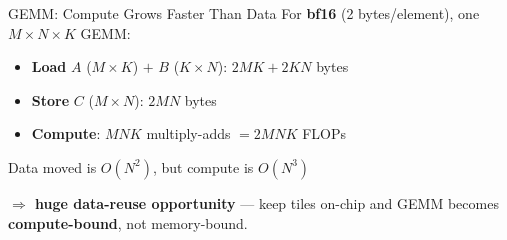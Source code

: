 \documentclass[aspectratio=169,professionalfonts]{beamer}
\begin{document}
\begin{frame}{GEMM: Compute Grows Faster Than Data}
  For \textbf{bf16} (2 bytes/element), one $M\times N\times K$ GEMM:
  \vspace{0.15cm}
  \begin{itemize}
    \item \textbf{Load} $A$ ($M{\times}K$) $+$ $B$ ($K{\times}N$):
      \quad $2MK + 2KN$ bytes
    \item \textbf{Store} $C$ ($M{\times}N$): \quad $2MN$ bytes
    \item \textbf{Compute}: \quad $MNK$ multiply-adds $=2MNK$ FLOPs
  \end{itemize}

  \vspace{0.25cm}
  \begin{center}
    Data moved is $O(N^2)$, but compute is $O(N^3)$
  \end{center}

  \vspace{0.25cm}
  \centering \textbf{$\Rightarrow$ huge data-reuse opportunity} --- keep tiles
  on-chip and GEMM becomes \textbf{compute-bound}, not memory-bound.
\end{frame}
\end{document}
